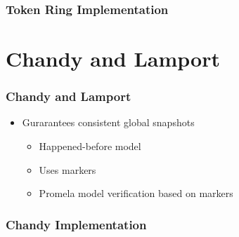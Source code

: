 \documentclass[t, pdftex]{beamer}
\begin{document}
\begin{frame}
	\frametitle{Token Ring Implementation}
	  \begin{multicols*}{3}
    
  \end{multicols*}
\end{frame}


\section{Chandy and Lamport}
\begin{frame}[c]
    \frametitle{Chandy and Lamport}
    \begin{itemize}
		\item Gurarantees consistent global snapshots
		 \begin{itemize}
          \item Happened-before model
          \item Uses markers
	\item Promela model verification based on markers
        \end{itemize}
    \end{itemize}
	
	
\end{frame}

\begin{frame}
	\frametitle{Chandy Implementation}
	  \begin{multicols*}{3}
    
  \end{multicols*}
\end{frame}
\end{document}
